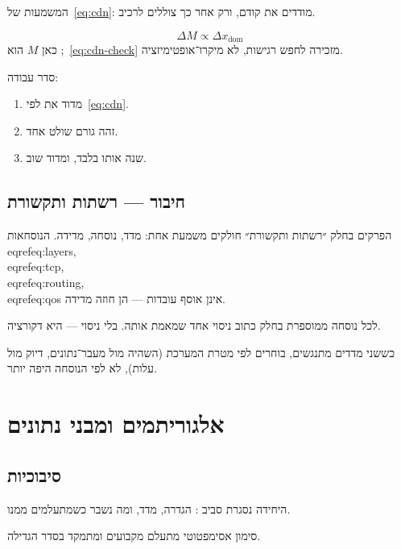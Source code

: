 המשמעות של~\eqref{eq:cdn}: מודדים את  קודם, ורק אחר כך צוללים לרכיב.

\begin{equation}
\label{eq:cdn-check}
\Delta M \propto \Delta x_{\mathrm{dom}}
\end{equation}
כאן $M$ הוא ;~\eqref{eq:cdn-check} מזכירה לחפש רגישות, לא מיקרו־אופטימיזציה.

סדר עבודה:
\begin{enumerate}
\item[(\textbf{א})] מדוד את  לפי~\eqref{eq:cdn}.
\item[(\textbf{ב})] זהה גורם שולט אחד.
\item[(\textbf{ג})] שנה אותו בלבד, ומדוד שוב.
\end{enumerate}


\chapter{חיבור — רשתות ותקשורת}
\label{ch:bridge-layers}

הפרקים בחלק ״רשתות ותקשורת״ חולקים משמעת אחת: מדד, נוסחה, מדידה.
הנוסחאות \\eqref{eq:layers}, \\eqref{eq:tcp}, \\eqref{eq:routing}, \\eqref{eq:qos} אינן אוסף עובדות — הן חוזה מדידה.

\begin{keybox}[frametitle={חוזה החלק}]
לכל נוסחה ממוספרת בחלק כתוב ניסוי אחד שמאמת אותה. בלי ניסוי — היא דקורציה.
\end{keybox}

כששני מדדים מתנגשים, בוחרים לפי מטרת המערכת (השהיה מול מעבר־נתונים, דיוק מול עלות),
לא לפי הנוסחה היפה יותר.

\part{אלגוריתמים ומבני נתונים}

\chapter{סיבוכיות}
\label{ch:complexity}

היחידה נסגרת סביב : הגדרה, מדד, ומה נשבר כשמתעלמים ממנו.

\begin{defbox}[frametitle={הגדרה — סיבוכיות}]
סימון אסימפטוטי מתעלם מקבועים ומתמקד בסדר הגדילה.
\end{defbox}

